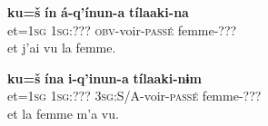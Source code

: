 \documentclass[oldfontcommands,twoside,a4paper,12pt]{article}
\newcommand{\ipa}[1]{{\phon\textbf{#1}}}
\begin{document}
 
 \begin{exe}
\ex 
\gll
\ipa{ku=š}  	\ipa{ín}  	\ipa{á-q'ínun-a}  	\ipa{tílaaki-na}  \\
et=\textsc{1sg} \textsc{1sg}:??? \textsc{obv}-voir-\textsc{passé} femme-??? \\
\glt et j'ai vu la femme.
\end{exe}

 \begin{exe}
\ex 
\gll
\ipa{ku=š}  	\ipa{ína}  	\ipa{i-q'inun-a}  	\ipa{tílaaki-nɨm}  \\
et=\textsc{1sg} \textsc{1sg}:???  \textsc{3sg}:S/A-voir-\textsc{passé} femme-??? \\
\glt et la femme m'a vu.
\end{exe}
\end{document}
